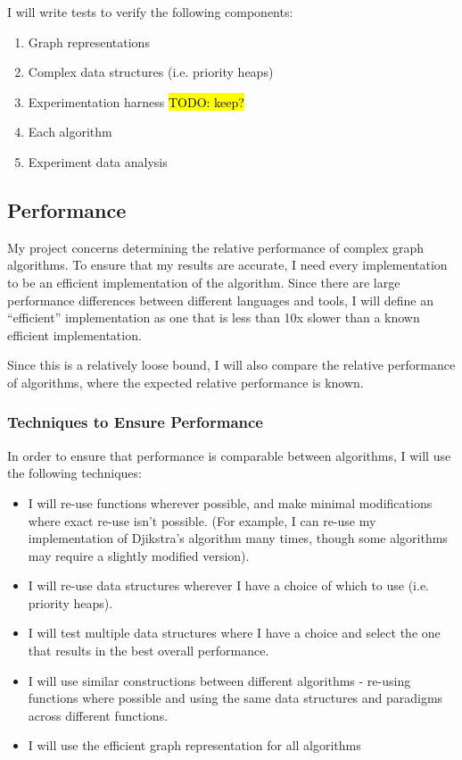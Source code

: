 \documentclass[12pt,a4paper,twoside,openright]{report}
\newcommand{\todo}[1]{\hl{TODO: #1}}
\begin{document}
			I will write tests to verify the following components:
			\begin{enumerate}
				\item Graph representations
				\item Complex data structures (i.e. priority heaps)
				\item Experimentation harness \todo{keep?}
				\item Each algorithm
				\item Experiment data analysis
			\end{enumerate} 
		\subsection{Performance}
			My project concerns determining the relative performance of complex graph algorithms. To ensure that my results are accurate, I need every implementation to be an efficient implementation of the algorithm. Since there are large performance differences between different languages and tools, I will define an ``efficient'' implementation as one that is less than 10x slower than a known efficient implementation.
			
			Since this is a relatively loose bound, I will also compare the relative performance of algorithms, where the expected relative performance is known.
			\subsubsection{Techniques to Ensure Performance}
				In order to ensure that performance is comparable between algorithms, I will use the following techniques:
				\begin{itemize}
					\item I will re-use functions wherever possible, and make minimal modifications where exact re-use isn't possible. (For example, I can re-use my implementation of Djikstra's algorithm many times, though some algorithms may require a slightly modified version).
					\item I will re-use data structures wherever I have a choice of which to use (i.e. priority heaps).
					\item I will test multiple data structures where I have a choice and select the one that results in the best overall performance.
					\item I will use similar constructions between different algorithms - re-using functions where possible and using the same data structures and paradigms across different functions.
					\item I will use the efficient graph representation for all algorithms
				\end{itemize}
\end{document}

